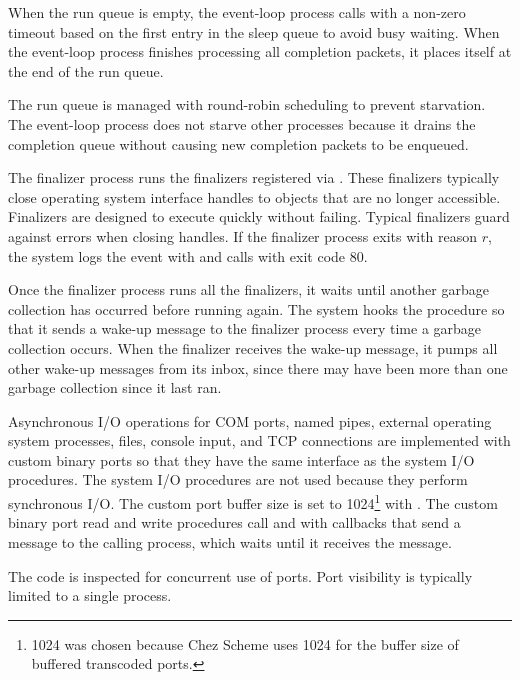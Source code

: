 When the run queue is empty, the event-loop process calls
 with a non-zero timeout based on the
first entry in the sleep queue to avoid busy waiting. When the
event-loop process finishes processing all completion packets, it
places itself at the end of the run queue.

  \mitigation The
run queue is managed with round-robin scheduling to prevent
starvation. The event-loop process does not starve other processes
because it drains the completion queue without causing new completion
packets to be enqueued.

The finalizer process runs the finalizers registered via
. These finalizers typically close operating
system interface handles to objects that are no longer
accessible.   \mitigation Finalizers are designed to execute quickly
without failing. Typical finalizers guard against errors when closing
handles. If the finalizer process exits with reason $r$, the
system logs the event
 with
 and calls 
with exit code 80.

Once the finalizer process runs all the finalizers, it waits until
another garbage collection has occurred before running again. The
system hooks the  procedure so that
it sends a wake-up message to the finalizer process every time a
garbage collection occurs.  When the finalizer receives the wake-up
message, it pumps all other wake-up messages from its inbox, since
there may have been more than one garbage collection since it last
ran.

Asynchronous I/O operations for COM ports, named pipes, external
operating system processes, files, console input, and TCP connections
are implemented with custom binary ports so that they have the same
interface as the system I/O procedures. The system I/O procedures are
not used because they perform synchronous I/O.  The custom port buffer
size is set to 1024\footnote{1024 was chosen because Chez Scheme uses
  1024 for the buffer size of buffered transcoded ports.} with
.  The custom binary port read and
write procedures call  and
 with callbacks that send a message to the
calling process, which waits until it receives the message.

  \mitigation The code is
inspected for concurrent use of ports. Port visibility is typically
limited to a single process.


